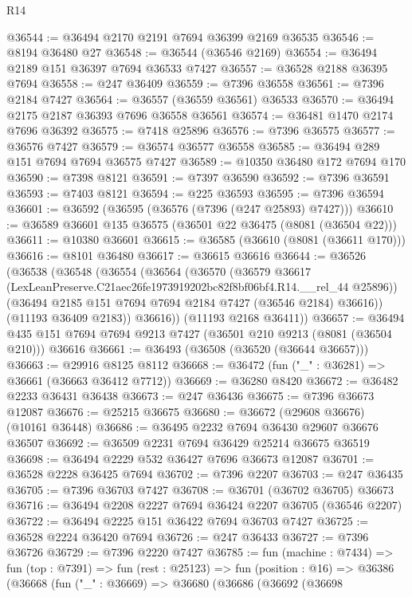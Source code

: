 \begin{lexlean}{R14}
\begin{coremodule}
@36544 := @36494 @2170 @2191 @7694 @36399 @2169 @36535
@36546 := @8194 @36480 @27
@36548 := @36544 (@36546 @2169)
@36554 := @36494 @2189 @151 @36397 @7694 @36533 @7427
@36557 := @36528 @2188 @36395 @7694
@36558 := @247 @36409
@36559 := @7396 @36558
@36561 := @7396 @2184 @7427
@36564 := @36557 (@36559 @36561) @36533
@36570 := @36494 @2175 @2187 @36393 @7696 @36558 @36561
@36574 := @36481 @1470 @2174 @7696 @36392
@36575 := @7418 @25896
@36576 := @7396 @36575
@36577 := @36576 @7427
@36579 := @36574 @36577 @36558
@36585 := @36494 @289 @151 @7694 @7694 @36575 @7427
@36589 := @10350 @36480 @172 @7694 @170
@36590 := @7398 @8121
@36591 := @7397 @36590
@36592 := @7396 @36591
@36593 := @7403 @8121
@36594 := @225 @36593
@36595 := @7396 @36594
@36601 := @36592 (@36595 (@36576 (@7396 (@247 @25893) @7427)))
@36610 := @36589 @36601 @135 @36575 (@36501 @22 @36475 (@8081 (@36504 @22)))
@36611 := @10380 @36601
@36615 := @36585 (@36610 (@8081 (@36611 @170)))
@36616 := @8101 @36480
@36617 := @36615 @36616
@36644 := @36526
    (@36538
      (@36548
        (@36554
          (@36564
            (@36570
              (@36579
                @36617
                (LexLeanPreserve.C21aec26fe1973919202bc82f8bf06bf4.R14.__rel_44 @25896))
              (@36494 @2185 @151 @7694 @7694 @2184 @7427 (@36546 @2184) @36616))
            (@11193 @36409 @2183))
          @36616))
      (@11193 @2168 @36411))
@36657 := @36494 @435 @151 @7694 @7694 @9213 @7427 (@36501 @210 @9213 (@8081 (@36504 @210))) @36616
@36661 := @36493 (@36508 (@36520 (@36644 @36657)))
@36663 := @29916 @8125 @8112
@36668 := @36472 (fun ("_" : @36281) => @36661 (@36663 @36412 @7712))
@36669 := @36280 @8420
@36672 := @36482 @2233 @36431 @36438
@36673 := @247 @36436
@36675 := @7396 @36673 @12087
@36676 := @25215 @36675
@36680 := @36672 (@29608 @36676) (@10161 @36448)
@36686 := @36495 @2232 @7694 @36430 @29607 @36676 @36507
@36692 := @36509 @2231 @7694 @36429 @25214 @36675 @36519
@36698 := @36494 @2229 @532 @36427 @7696 @36673 @12087
@36701 := @36528 @2228 @36425 @7694
@36702 := @7396 @2207
@36703 := @247 @36435
@36705 := @7396 @36703 @7427
@36708 := @36701 (@36702 @36705) @36673
@36716 := @36494 @2208 @2227 @7694 @36424 @2207 @36705 (@36546 @2207)
@36722 := @36494 @2225 @151 @36422 @7694 @36703 @7427
@36725 := @36528 @2224 @36420 @7694
@36726 := @247 @36433
@36727 := @7396 @36726
@36729 := @7396 @2220 @7427
@36785 := fun (machine : @7434) =>
  fun (top : @7391) =>
  fun (rest : @25123) =>
  fun (position : @16) =>
  @36386
    (@36668
      (fun ("_" : @36669) =>
      @36680
        (@36686
          (@36692
            (@36698

\end{coremodule}
\end{lexlean}
